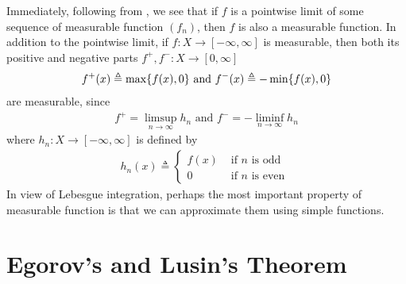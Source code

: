 \documentclass{report}
\begin{document}
\begin{mdframed}
Immediately, following from , we see that if $f$ is a pointwise limit of some sequence of measurable function $(f_n)$, then $f$ is also a measurable function. In addition to the pointwise limit, if $f:X\rightarrow [-\infty,\infty]$ is measurable, then both its positive and negative parts  $f^+,f^-:X\rightarrow [0,\infty]$ 
\begin{align*}
f^+(x)\triangleq \max \{ f(x),0 \}\text{ and }f^-(x)\triangleq  - \min  \{ f(x),0 \}
\end{align*}
are measurable, since 
\begin{align*}
f^+=\limsup_{n\to\infty} h_n\text{ and }f^-=-\liminf_{n\to\infty} h_n
\end{align*}
where $h_n:X\rightarrow [-\infty,\infty]$ is defined by 
\begin{align*}
h_n(x)\triangleq \begin{cases}
  f(x)& \text{ if $n$ is odd }\\
  0& \text{ if $n$ is even }
\end{cases}
\end{align*}
In view of Lebesgue integration, perhaps the most important property of measurable function is that we can approximate them using simple functions. 
\end{mdframed}
\section{Egorov's and Lusin's Theorem}
\end{document}
